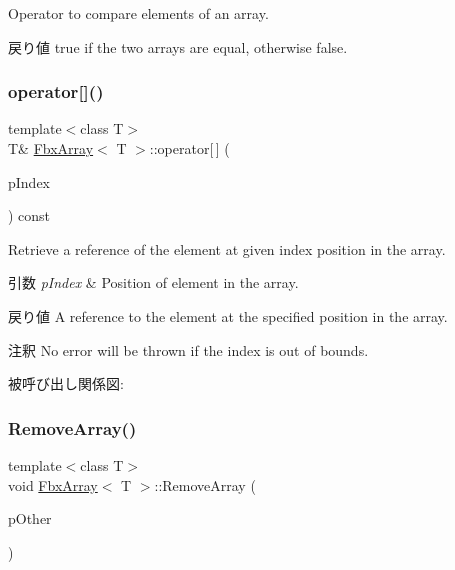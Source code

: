 Operator to compare elements of an array. \begin{DoxyReturn}{戻り値}
{\ttfamily true} if the two arrays are equal, otherwise {\ttfamily false}. 
\end{DoxyReturn}
\mbox{\label{class_fbx_array_a163616f4c5bedff84cb6f7f1f8471eb8}} 
\subsubsection{\texorpdfstring{operator[]()}{operator[]()}}
{\footnotesize\ttfamily template$<$class T$>$ \\
T\& \hyperlink{class_fbx_array}{Fbx\+Array}$<$ T $>$\+::operator\mbox{[}$\,$\mbox{]} (\begin{DoxyParamCaption}\item[{const int}]{p\+Index }\end{DoxyParamCaption}) const}

Retrieve a reference of the element at given index position in the array. 
\begin{DoxyParams}{引数}
{\em p\+Index} & Position of element in the array. \\
\hline
\end{DoxyParams}
\begin{DoxyReturn}{戻り値}
A reference to the element at the specified position in the array. 
\end{DoxyReturn}
\begin{DoxyRemark}{注釈}
No error will be thrown if the index is out of bounds. 
\end{DoxyRemark}
被呼び出し関係図\+:
\mbox{\label{class_fbx_array_a3884ec0b5b7eacf3fd636f9dfd77e619}} 
\subsubsection{\texorpdfstring{Remove\+Array()}{RemoveArray()}}
{\footnotesize\ttfamily template$<$class T$>$ \\
void \hyperlink{class_fbx_array}{Fbx\+Array}$<$ T $>$\+::Remove\+Array (\begin{DoxyParamCaption}\item[{const \hyperlink{class_fbx_array}{Fbx\+Array}$<$ T $>$ \&}]{p\+Other }\end{DoxyParamCaption})}

